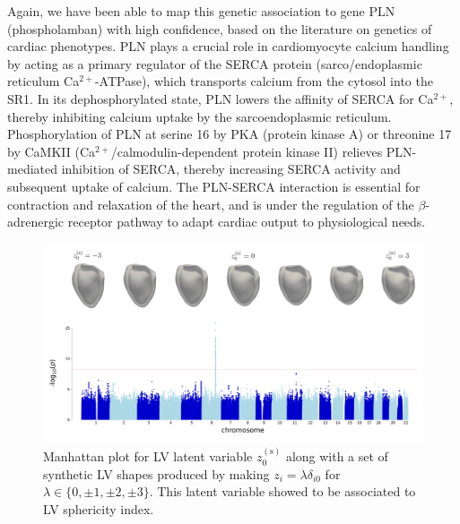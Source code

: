 Again, we have been able to map this genetic association to gene PLN (phospholamban) with high confidence, based on the literature on genetics of cardiac phenotypes. 
PLN plays a crucial role in cardiomyocyte calcium handling by acting as a primary regulator of the SERCA protein (sarco/endoplasmic reticulum Ca$^{2+}$-ATPase), which transports calcium from the cytosol into the SR1. In its dephosphorylated state, PLN lowers the affinity of SERCA for Ca$^{2+}$, thereby inhibiting calcium uptake by the sarcoendoplasmic reticulum. Phosphorylation of PLN at serine 16 by PKA (protein kinase A) or threonine 17 by CaMKII (Ca$^{2+}$/calmodulin-dependent protein kinase II) relieves PLN-mediated inhibition of SERCA, thereby increasing SERCA activity and subsequent uptake of calcium. The PLN-SERCA interaction is essential for contraction and relaxation of the heart, and is under the regulation of the $\beta$-adrenergic receptor pathway to adapt cardiac output to physiological needs. \cite{maclennan_2003}

\begin{figure}[ht!]
\includegraphics[width=\textwidth]{figs/gwas/GWAS_Experiment1_z0s_scaled_meshes.png}
\caption{Manhattan plot for LV latent variable $z_0^{(\text{s})}$ along with a set of synthetic LV shapes produced by making $z_i=\lambda \delta_{i0}$ for $\lambda\in\{0, \pm 1, \pm 2, \pm 3\}$. This latent variable showed to be associated to LV sphericity index.}
\label{fig:manhattan_LV_latent}
\end{figure}

